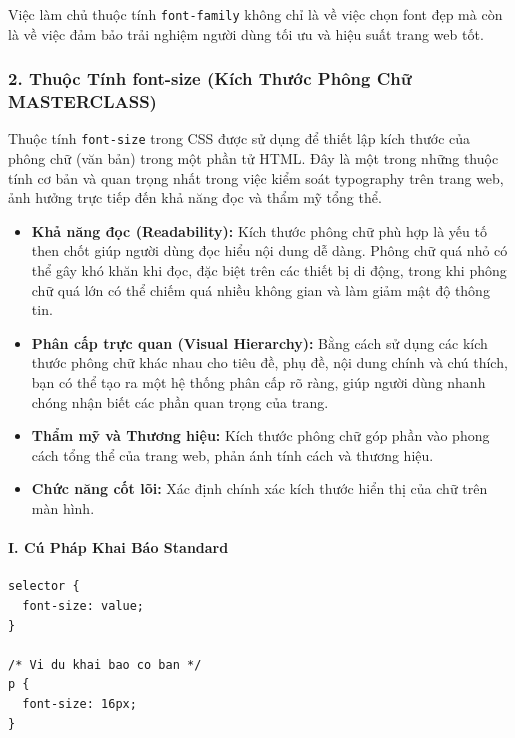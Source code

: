 \documentclass[11pt,oneside]{book}
\newcommand{\codeinline}[1]{\textcolor{accentOrange}{\texttt{#1}}}
\begin{document}
Việc làm chủ thuộc tính \codeinline{font-family} không chỉ là về việc chọn font đẹp mà còn là về việc đảm bảo trải nghiệm người dùng tối ưu và hiệu suất trang web tốt.

\subsubsection{2. Thuộc Tính font-size (Kích Thước Phông Chữ MASTERCLASS)}
\label{sec:font_size}

Thuộc tính \codeinline{font-size} trong CSS được sử dụng để thiết lập kích thước của phông chữ (văn bản) trong một phần tử HTML. Đây là một trong những thuộc tính cơ bản và quan trọng nhất trong việc kiểm soát typography trên trang web, ảnh hưởng trực tiếp đến khả năng đọc và thẩm mỹ tổng thể.

\begin{conceptBox}
\begin{itemize}[leftmargin=1.5em, itemsep=4pt, parsep=0pt]
    \item \textbf{Khả năng đọc (Readability):} Kích thước phông chữ phù hợp là yếu tố then chốt giúp người dùng đọc hiểu nội dung dễ dàng. Phông chữ quá nhỏ có thể gây khó khăn khi đọc, đặc biệt trên các thiết bị di động, trong khi phông chữ quá lớn có thể chiếm quá nhiều không gian và làm giảm mật độ thông tin.
    \item \textbf{Phân cấp trực quan (Visual Hierarchy):} Bằng cách sử dụng các kích thước phông chữ khác nhau cho tiêu đề, phụ đề, nội dung chính và chú thích, bạn có thể tạo ra một hệ thống phân cấp rõ ràng, giúp người dùng nhanh chóng nhận biết các phần quan trọng của trang.
    \item \textbf{Thẩm mỹ và Thương hiệu:} Kích thước phông chữ góp phần vào phong cách tổng thể của trang web, phản ánh tính cách và thương hiệu.
    \item \textbf{Chức năng cốt lõi:} Xác định chính xác kích thước hiển thị của chữ trên màn hình.
\end{itemize}
\end{conceptBox}

\paragraph*{I. Cú Pháp Khai Báo Standard}
\begin{codeWindow}
\begin{lstlisting}[language=CSS3]
selector {
  font-size: value;
}

/* Vi du khai bao co ban */
p {
  font-size: 16px;
}
\end{lstlisting}
\end{codeWindow}
\end{document}
